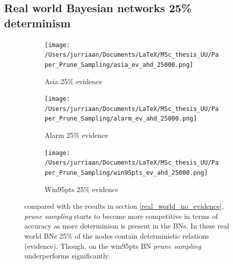 \documentclass[a4paper, twoside, 11pt]{report}
\theoremstyle{plain}
\theoremstyle{definition}
\theoremstyle{remark}
\newcommand{\ps}{\textit{prune sampling }}
\begin{document}
\newpage
\subsection{Real world Bayesian networks 25\% determinism}

\begin{figure}[H]
\centering
\begin{subfigure}{0.5\textwidth}
\texttt{[image: /Users/jurriaan/Documents/LaTeX/MSc\_thesis\_UU/Paper\_Prune\_Sampling/asia\_ev\_ahd\_25000.png]}
\caption{Asia 25\% evidence}%
\label{asia}%
\end{subfigure}\hfill%
\begin{subfigure}{0.5\textwidth}
\texttt{[image: /Users/jurriaan/Documents/LaTeX/MSc\_thesis\_UU/Paper\_Prune\_Sampling/alarm\_ev\_ahd\_25000.png]}
\caption{Alarm 25\% evidence}%
\label{alarm}%
\end{subfigure}%
\begin{subfigure}{0.5\textwidth}
\texttt{[image: /Users/jurriaan/Documents/LaTeX/MSc\_thesis\_UU/Paper\_Prune\_Sampling/win95pts\_ev\_ahd\_25000.png]}
\caption{Win95pts 25\% evidence}%
\label{win95pts}%
\end{subfigure}\hfill%
\vspace{0.75pc}
\caption{compared with the results in section \ref{real_world_no_evidence}, \ps starts to become more competitive in terms of accuracy as more determinism is present in the BNs. In these real world BNs 25\% of the nodes contain deterministic relations (evidence). Though, on the win95pts BN \ps underperforms significantly.}
\label{results2}
\end{figure}

\newpage
\end{document}
